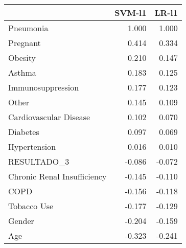 \begin{tabular}{lrr}
\toprule
{} &  SVM-l1 &  LR-l1 \\
\midrule
Pneumonia                   &   1.000 &  1.000 \\
Pregnant                    &   0.414 &  0.334 \\
Obesity                     &   0.210 &  0.147 \\
Asthma                      &   0.183 &  0.125 \\
Immunosuppression           &   0.177 &  0.123 \\
Other                       &   0.145 &  0.109 \\
Cardiovascular Disease      &   0.102 &  0.070 \\
Diabetes                    &   0.097 &  0.069 \\
Hypertension                &   0.016 &  0.010 \\
RESULTADO\_3                 &  -0.086 & -0.072 \\
Chronic Renal Insufficiency &  -0.145 & -0.110 \\
COPD                        &  -0.156 & -0.118 \\
Tobacco Use                 &  -0.177 & -0.129 \\
Gender                      &  -0.204 & -0.159 \\
Age                         &  -0.323 & -0.241 \\
\bottomrule
\end{tabular}
